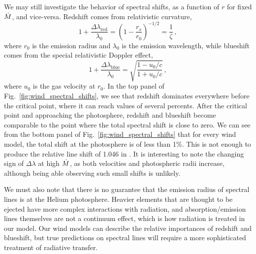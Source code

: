 \documentclass[../main.tex]{subfiles}
\begin{document}
\begingroup
\allowdisplaybreaks
We may still investigate the behavior of spectral shifts, as a function of $r$ for fixed $\dot{M}$, and vice-versa. Redshift comes from relativistic curvature,
\begin{equation}
    1+\frac{\Delta\lambda_\text{red}}{\lambda_0}=\left(1-\frac{r_s}{r_0}\right)^{-1/2}=\frac{1}{\zeta}\,,
\end{equation}
\endgroup
where $r_0$ is the emission radius and $\lambda_0$ is the emission wavelength, while blueshift comes from the special relativistic Doppler effect,
\begin{equation}
    1+\frac{\Delta\lambda_\text{blue}}{\lambda_0}=\sqrt{\frac{1-u_0/c}{1+u_0/c}}\,,
\end{equation}
where $u_0$ is the gas velocity at $r_0$. In the top panel of Fig.~\ref{fig:wind_spectral_shifts}, we see that redshift dominates everywhere before the critical point, where it can reach values of several percents. After the critical point and approaching the photosphere, redshift and blueshift become comparable to the point where the total spectral shift is close to zero. We can see from the bottom panel of Fig.~\ref{fig:wind_spectral_shifts} that for every wind model, the total shift at the photosphere is of less than 1\%. This is not enough to produce the relative line shift of 1.046 in \citet{Strohmayer2019}. It is interesting to note the changing sign of $\Delta\lambda$ at high $\dot{M}$, as both velocities and photospheric radii increase, although being able observing such small shifts is unlikely.

We must also note that there is no guarantee that the emission radius of spectral lines is at the Helium photosphere. Heavier elements that are thought to be ejected have more complex interactions with radiation, and absorption/emission lines themselves are not a continuum effect, which is how radiation is treated in our model. Our wind models can describe the relative importances of redshift and blueshift, but true predictions on spectral lines will require a more sophisticated treatment of radiative transfer.
\end{document}
